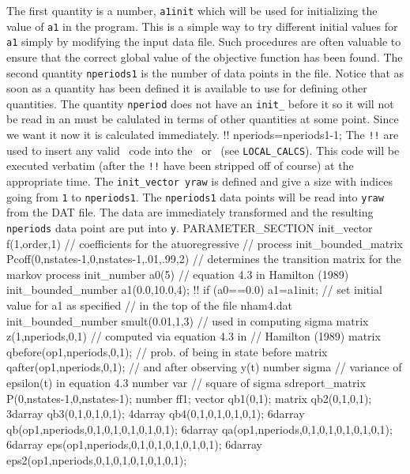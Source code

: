 \documentclass[12pt]{book}
\begin{document}
The first quantity is a number, {\tt a1init} which will be used for initializing the
value of {\tt a1} in the program. This is a simple way to try 
different initial values for {\tt a1} simply by modifying the input data file.
Such procedures are often valuable to ensure that the correct global
value of the objective function has been found.
The  second quantity {\tt nperiods1} is the number of data points in the
file. Notice that as soon as a quantity has been defined it is available to use for
defining other quantities. The quantity {\tt nperiod} does not have an
{\tt init\_} before it so it will not be read in an must be calulated
in terms of other quantities at some point. Since we want it now it is 
calculated immediately.
\beginexample
 !! nperiods=nperiods1-1;
\endexample
{}
\noindent The {\tt !!} are used to insert any valid \cplus\ code into the \DS\
or \PS\ (see {\tt LOCAL\_CALCS}). 
This code will be executed verbatim (after the {\tt !!} have been stripped off of
course) at the appropriate time.
The {\tt init\_vector yraw} is defined  and give a size with indices going from
{\tt 1} to {\tt nperiods1}. The {\tt nperiods1} data points will be read into
{\tt yraw} from the DAT file. 
The data are immediately transformed and the resulting
{\tt nperiods} data point are put into {\tt y}.
\beginexample
PARAMETER_SECTION
  init_vector f(1,order,1)  // coefficients for the atuoregressive
                            // process
  init_bounded_matrix Pcoff(0,nstates-1,0,nstates-1,.01,.99,2)  
        // determines the transition matrix for the markov process
  init_number a0(5)  // equation 4.3 in Hamilton (1989)
  init_bounded_number a1(0.0,10.0,4);  
 !! if (a0==0.0) a1=a1init;  // set initial value for a1 as specified
                     // in the top of the file nham4.dat
  init_bounded_number smult(0.01,1,3)  // used in computing sigma
  matrix z(1,nperiods,0,1)  // computed via equation 4.3 in 
                          // Hamilton (1989)
  matrix qbefore(op1,nperiods,0,1);  // prob. of being in state before
  matrix qafter(op1,nperiods,0,1); // and after observing y(t)
  number sigma // variance of epsilon(t) in equation 4.3
  number var  // square of sigma
  sdreport_matrix P(0,nstates-1,0,nstates-1);
  number ff1;
  vector qb1(0,1); 
  matrix qb2(0,1,0,1); 
  3darray qb3(0,1,0,1,0,1);
  4darray qb4(0,1,0,1,0,1,0,1);
  6darray qb(op1,nperiods,0,1,0,1,0,1,0,1,0,1); 
  6darray qa(op1,nperiods,0,1,0,1,0,1,0,1,0,1);
  6darray eps(op1,nperiods,0,1,0,1,0,1,0,1,0,1);
  6darray eps2(op1,nperiods,0,1,0,1,0,1,0,1,0,1);
\end{document}
